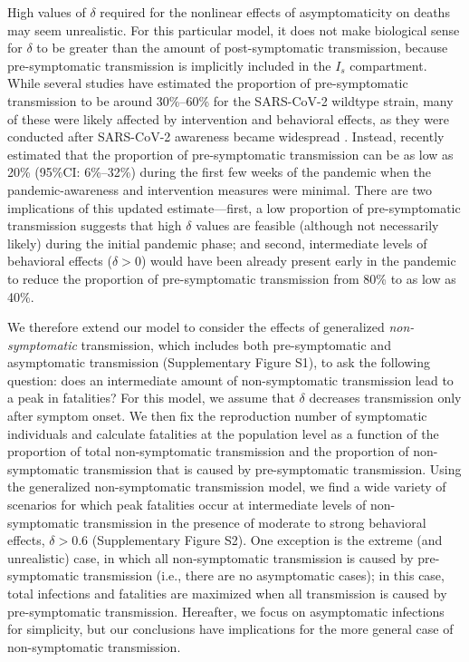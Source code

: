 \documentclass[12pt]{article}
\begin{document}
High values of $\delta$ required for the nonlinear effects of asymptomaticity on deaths may seem unrealistic.
For this particular model, it does not make biological sense for $\delta$ to be greater than the amount of post-symptomatic transmission, because pre-symptomatic transmission is implicitly included in the $I_s$ compartment.
While several studies have estimated the proportion of pre-symptomatic transmission to be around 30\%--60\% for the SARS-CoV-2 wildtype strain, many of these were likely affected by intervention and behavioral effects, as they were conducted after SARS-CoV-2 awareness became widespread \citep{he2020temporal}.
Instead, \cite{sender2021unmitigated} recently estimated that the proportion of pre-symptomatic transmission can be as low as 20\% (95\%CI: 6\%--32\%) during the first few weeks of the pandemic when the pandemic-awareness and intervention measures were minimal.
There are two implications of this updated estimate---first, a low proportion of pre-symptomatic transmission suggests that high $\delta$ values are feasible (although not necessarily likely) during the initial pandemic phase; and second, intermediate levels of behavioral effects ($\delta > 0$) would have been already present early in the pandemic to reduce the proportion of pre-symptomatic transmission from 80\% to as low as 40\%.

We therefore extend our model to consider the effects of generalized \textit{non-symptomatic} transmission, which includes both pre-symptomatic and asymptomatic transmission (Supplementary Figure S1), to ask the following question:
does an intermediate amount of non-symptomatic transmission lead to a peak in fatalities?
For this model, we assume that $\delta$ decreases transmission only after symptom onset.
We then fix the reproduction number of symptomatic individuals and calculate fatalities at the population level as a function of the proportion of total non-symptomatic transmission and the proportion of non-symptomatic transmission that is caused by pre-symptomatic transmission.
Using the generalized non-symptomatic transmission model, we find a wide variety of scenarios for which peak fatalities occur at intermediate levels of non-symptomatic transmission in the presence of moderate to strong behavioral effects, $\delta > 0.6$ (Supplementary Figure S2).
One exception is the extreme (and unrealistic) case, in which all non-symptomatic transmission is caused by pre-symptomatic transmission (i.e., there are no asymptomatic cases);
in this case, total infections and fatalities are maximized when all transmission is caused by pre-symptomatic transmission. 
Hereafter, we focus on asymptomatic infections for simplicity, but our conclusions have implications for the more general case of non-symptomatic transmission.
\end{document}

